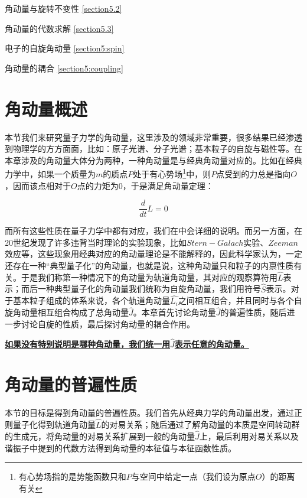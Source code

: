 \begin{introduction}
    \item 角动量与旋转不变性 \ref{section5.2}
    \item 角动量的代数求解  \ref{section5.3}
    \item 电子的自旋角动量 \ref{section5:spin}
    \item 角动量的耦合 \ref{section5:coupling}
\end{introduction}
\section{角动量概述}
本节我们来研究量子力学的角动量，这里涉及的领域非常重要，很多结果已经渗透到物理学的方方面面，比如：原子光谱、分子光谱；基本粒子的自旋与磁性等。在本章涉及的角动量大体分为两种，一种角动量是与经典角动量对应的。比如在经典力学中，如果一个质量为$m$的质点$P$处于有心势场\footnote{有心势场指的是势能函数只和$P$与空间中给定一点（我们设为原点$O$）的距离有关}中，则$P$点受到的力总是指向$O$，因而该点相对于$O$点的力矩为0，于是满足角动量定理：

\begin{equation}
     \frac{d}{dt}L=0
\end{equation}

而所有这些性质在量子力学中都有对应，我们在中会详细的说明。而另一方面，在20世纪发现了许多违背当时理论的实验现象，比如$Stern-Galach$实验、$Zeeman$效应等，这些现象用经典对应的角动量理论是不能解释的，因此科学家认为，一定还存在一种“典型量子化”的角动量，也就是说，这种角动量只和粒子的内禀性质有关。于是我们称第一种情况下的角动量为轨道角动量，其对应的观察算符用$\hat{L}$表示；而后一种典型量子化的角动量我们统称为自旋角动量，我们用符号$\hat{S}$表示。对于基本粒子组成的体系来说，各个轨道角动量$\hat{L_i}$之间相互组合，并且同时与各个自旋角动量相互组合构成了总角动量$\hat{J}$。本章首先讨论角动量$\hat{J}$的普遍性质，随后进一步讨论自旋的性质，最后探讨角动量的耦合作用。

\begin{remark}
\underline{\textbf{如果没有特别说明是哪种角动量，我们统一用$\hat{J}$表示任意的角动量。}}
\end{remark}
\section{角动量的普遍性质}
本节的目标是得到角动量的普遍性质。我们首先从经典力学的角动量出发，通过正则量子化得到轨道角动量$\hat{L}$的对易关系；随后通过了解角动量的本质是空间转动群的生成元，将角动量的对易关系扩展到一般的角动量$\hat{J}$上，最后利用对易关系以及谐振子中提到的代数方法得到角动量的本征值与本征函数性质。
